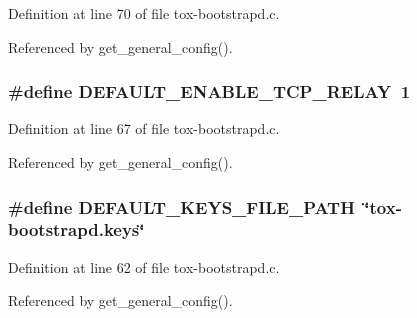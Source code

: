 Definition at line 70 of file tox-\/bootstrapd.\+c.



Referenced by get\+\_\+general\+\_\+config().

\hypertarget{tox-bootstrapd_8c_acfa79b0cd7c40eb8d55462d8b8fa0e17}{
\subsubsection[{D\+E\+F\+A\+U\+L\+T\+\_\+\+E\+N\+A\+B\+L\+E\+\_\+\+T\+C\+P\+\_\+\+R\+E\+L\+A\+Y}]{\setlength{\rightskip}{0pt plus 5cm}\#define D\+E\+F\+A\+U\+L\+T\+\_\+\+E\+N\+A\+B\+L\+E\+\_\+\+T\+C\+P\+\_\+\+R\+E\+L\+A\+Y~1}}\label{tox-bootstrapd_8c_acfa79b0cd7c40eb8d55462d8b8fa0e17}


Definition at line 67 of file tox-\/bootstrapd.\+c.



Referenced by get\+\_\+general\+\_\+config().

\hypertarget{tox-bootstrapd_8c_a1bdc61234638275814834465df95908a}{
\subsubsection[{D\+E\+F\+A\+U\+L\+T\+\_\+\+K\+E\+Y\+S\+\_\+\+F\+I\+L\+E\+\_\+\+P\+A\+T\+H}]{\setlength{\rightskip}{0pt plus 5cm}\#define D\+E\+F\+A\+U\+L\+T\+\_\+\+K\+E\+Y\+S\+\_\+\+F\+I\+L\+E\+\_\+\+P\+A\+T\+H~\char`\"{}tox-\/bootstrapd.\+keys\char`\"{}}}\label{tox-bootstrapd_8c_a1bdc61234638275814834465df95908a}


Definition at line 62 of file tox-\/bootstrapd.\+c.



Referenced by get\+\_\+general\+\_\+config().

